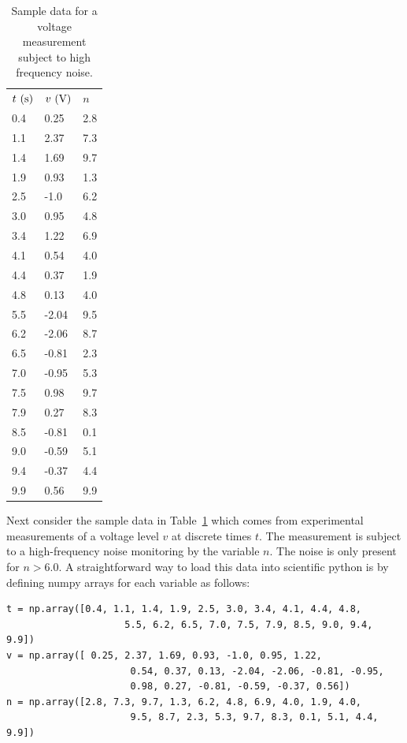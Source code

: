 \begin{table}
\caption{Sample data for a voltage measurement subject to high frequency noise.}
\label{tbl:hfnoiseeg}
\begin{center}
\begin{tabular}{lll}
$t~(\rm s)$ & $v~(\rm V)$ & $n$ \\
0.4  & 0.25  &  2.8 \\
1.1  & 2.37  &  7.3 \\
1.4  & 1.69  &  9.7 \\
1.9  & 0.93  &  1.3 \\
2.5  & -1.0  &  6.2 \\
3.0  & 0.95  &  4.8 \\
3.4  & 1.22  &  6.9 \\
4.1  & 0.54  &  4.0 \\
4.4  & 0.37  &  1.9 \\
4.8  & 0.13  &  4.0 \\
5.5  & -2.04  &  9.5 \\
6.2  & -2.06  &  8.7 \\
6.5  & -0.81  &  2.3 \\
7.0  & -0.95  &  5.3 \\
7.5  & 0.98  &  9.7 \\
7.9  & 0.27  &  8.3 \\
8.5  & -0.81  &  0.1 \\
9.0  & -0.59  &  5.1 \\
9.4  & -0.37  &  4.4 \\
9.9  & 0.56  &  9.9 \\
\end{tabular}
\end{center}
\end{table}

Next consider the sample data in Table~\ref{tbl:hfnoiseeg} which comes
from experimental measurements of a voltage level $v$ at discrete
times $t$.  The measurement is subject to a high-frequency noise
monitoring by the variable $n$.  The noise is only present for $n >
6.0$.  A straightforward way to load this data into scientific python
is by defining numpy arrays for each variable as follows:
\begin{verbatim}
t = np.array([0.4, 1.1, 1.4, 1.9, 2.5, 3.0, 3.4, 4.1, 4.4, 4.8, 
                     5.5, 6.2, 6.5, 7.0, 7.5, 7.9, 8.5, 9.0, 9.4, 9.9])
v = np.array([ 0.25, 2.37, 1.69, 0.93, -1.0, 0.95, 1.22,   
                      0.54, 0.37, 0.13, -2.04, -2.06, -0.81, -0.95,  
                      0.98, 0.27, -0.81, -0.59, -0.37, 0.56])
n = np.array([2.8, 7.3, 9.7, 1.3, 6.2, 4.8, 6.9, 4.0, 1.9, 4.0,  
                      9.5, 8.7, 2.3, 5.3, 9.7, 8.3, 0.1, 5.1, 4.4, 9.9])
\end{verbatim}

